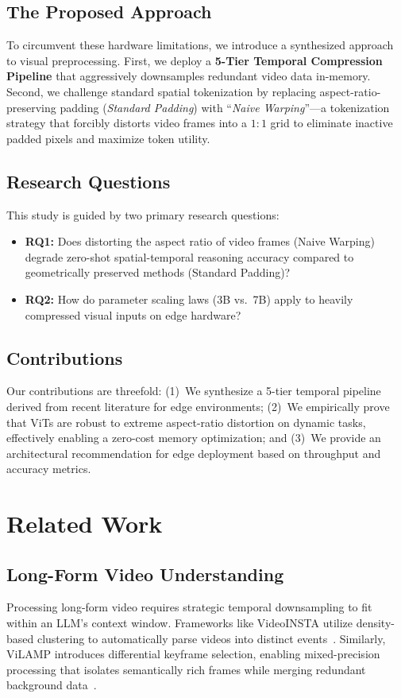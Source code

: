 \documentclass[conference]{IEEEtran}
\begin{document}
\subsection{The Proposed Approach}
To circumvent these hardware limitations, we introduce a synthesized
approach to visual preprocessing.
First, we deploy a \textbf{5-Tier Temporal Compression Pipeline} that
aggressively downsamples redundant video data in-memory.
Second, we challenge standard spatial tokenization by replacing
aspect-ratio-preserving padding (\emph{Standard Padding}) with
``\emph{Naive Warping}''---a tokenization strategy that forcibly distorts
video frames into a $1:1$ grid to eliminate inactive padded pixels and
maximize token utility.

\subsection{Research Questions}
This study is guided by two primary research questions:
\begin{itemize}
  \item \textbf{RQ1:} Does distorting the aspect ratio of video frames
    (Naive Warping) degrade zero-shot spatial-temporal reasoning accuracy
    compared to geometrically preserved methods (Standard Padding)?
  \item \textbf{RQ2:} How do parameter scaling laws (3B vs.\ 7B) apply to
    heavily compressed visual inputs on edge hardware?
\end{itemize}

\subsection{Contributions}
Our contributions are threefold:
(1)~We synthesize a 5-tier temporal pipeline derived from recent literature
for edge environments;
(2)~We empirically prove that ViTs are robust to extreme aspect-ratio
distortion on dynamic tasks, effectively enabling a zero-cost memory
optimization; and
(3)~We provide an architectural recommendation for edge deployment based on
throughput and accuracy metrics.

\section{Related Work}

\subsection{Long-Form Video Understanding}
Processing long-form video requires strategic temporal downsampling to fit
within an LLM's context window.
Frameworks like VideoINSTA utilize density-based clustering to automatically
parse videos into distinct events~\cite{videoINSTA}.
Similarly, ViLAMP introduces differential keyframe selection, enabling
mixed-precision processing that isolates semantically rich frames while
merging redundant background data~\cite{vilamp}.
\end{document}
